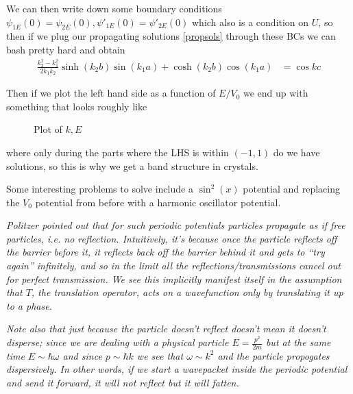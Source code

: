 \documentclass[12pt]{article}
\begin{document}
We can then write down some boundary conditions $\psi_{1E}(0) = \psi_{2E}(0), \psi'_{1E}(0) = \psi'_{2E}(0)$ which also is a condition on $U$, so then if we plug our propagating solutions \eqref{propsols} through these BCs we can bash pretty hard and obtain
\begin{align}
    \frac{k_2^2 - k_1^2}{2k_1k_2}\sinh\left( k_2b \right)\sin\left( k_1a \right) + \cosh(k_2b)\cos(k_1a) &= \cos kc
\end{align}

Then if we plot the left hand side as a function of $E/V_0$ we end up with something that looks roughly like
\begin{figure}[!h]
    \centering
    \caption{Plot of $k,E$}
\end{figure}
where only during the parts where the LHS is within $(-1,1)$ do we have solutions, so this is why we get a band structure in crystals. 

Some interesting problems to solve include a $\sin^2(x)$ potential and replacing the $V_0$ potential from before with a harmonic oscillator potential. 

{\em \small Politzer pointed out that for such periodic potentials particles propagate as if free particles, i.e. no reflection. Intuitively, it's because once the particle reflects off the barrier before it, it reflects back off the barrier behind it and gets to ``try again'' infinitely, and so in the limit all the reflections/transmissions cancel out for perfect transmission. We see this implicitly manifest itself in the assumption that $T$, the translation operator, acts on a wavefunction only by translating it up to a phase.}

{\em \small Note also that just because the particle doesn't reflect doesn't mean it doesn't disperse; since we are dealing with a physical particle $E = \frac{p^2}{2m}$ but at the same time $E \sim \hbar \omega$ and since $p \sim \hbar k$ we see that $\omega \sim k^2$ and the particle propogates dispersively. In other words, if we start a wavepacket inside the periodic potential and send it forward, it will not reflect but it will fatten.}
\end{document}
